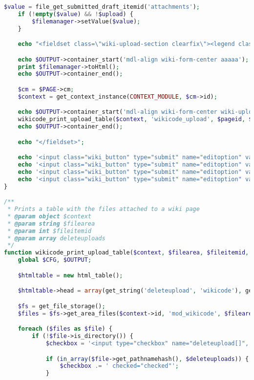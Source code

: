 \begin{lstlisting}[language=PHP]
    $value = file_get_submitted_draft_itemid('attachments');
    if (!empty($value) && !$upload) {
        $filemanager->setValue($value);
    }

    echo "<fieldset class=\"wiki-upload-section clearfix\"><legend class=\"ftoggler\">" . get_string("uploadtitle", 'wikicode') . "</legend>";

    echo $OUTPUT->container_start('mdl-align wiki-form-center aaaaa');
    print $filemanager->toHtml();
    echo $OUTPUT->container_end();

    $cm = $PAGE->cm;
    $context = get_context_instance(CONTEXT_MODULE, $cm->id);

    echo $OUTPUT->container_start('mdl-align wiki-form-center wiki-upload-table');
    wikicode_print_upload_table($context, 'wikicode_upload', $pageid, $deleteuploads);
    echo $OUTPUT->container_end();

    echo "</fieldset>";

    echo '<input class="wiki_button" type="submit" name="editoption" value="' . get_string('save', 'wikicode') . '"/>';
    echo '<input class="wiki_button" type="submit" name="editoption" value="' . get_string('upload', 'wikicode') . '"/>';
    echo '<input class="wiki_button" type="submit" name="editoption" value="' . get_string('preview') . '"/>';
    echo '<input class="wiki_button" type="submit" name="editoption" value="' . get_string('cancel') . '" />';
}

/**
 * Prints a table with the files attached to a wiki page
 * @param object $context
 * @param string $filearea
 * @param int $fileitemid
 * @param array deleteuploads
 */
function wikicode_print_upload_table($context, $filearea, $fileitemid, $deleteuploads = array()) {
    global $CFG, $OUTPUT;

    $htmltable = new html_table();

    $htmltable->head = array(get_string('deleteupload', 'wikicode'), get_string('uploadname', 'wikicode'), get_string('uploadactions', 'wiki'));

    $fs = get_file_storage();
    $files = $fs->get_area_files($context->id, 'mod_wikicode', $filearea, $fileitemid); //TODO: this is weird (skodak)

    foreach ($files as $file) {
        if (!$file->is_directory()) {
            $checkbox = '<input type="checkbox" name="deleteupload[]", value="' . $file->get_pathnamehash() . '"';

            if (in_array($file->get_pathnamehash(), $deleteuploads)) {
                $checkbox .= ' checked="checked"';
            }


\end{lstlisting}
